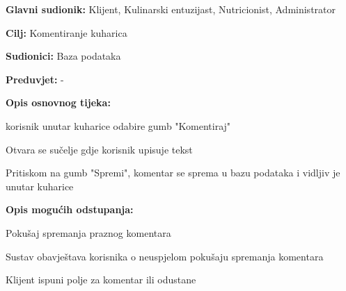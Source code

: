 			\noindent {}
					\begin{packed_item}
	
						\item \textbf{Glavni sudionik: }Klijent, Kulinarski entuzijast, Nutricionist, Administrator 
						\item  \textbf{Cilj:} Komentiranje kuharica
						\item  \textbf{Sudionici:} Baza podataka
						\item  \textbf{Preduvjet:} -
						\item  \textbf{Opis osnovnog tijeka:} 
						
						\item[] \begin{packed_enum}
	
							\item korisnik unutar kuharice odabire gumb "Komentiraj"
							\item Otvara se sučelje gdje korisnik upisuje tekst
							\item Pritiskom na gumb "Spremi", komentar se sprema u bazu podataka i vidljiv je unutar kuharice
						\end{packed_enum}
						
						\item  \textbf{Opis mogućih odstupanja:}
						
						\item[] \begin{packed_item}
	
							\item[2.a] Pokušaj spremanja praznog komentara
							\item[] \begin{packed_enum}
								
								\item Sustav obavještava korisnika o neuspjelom pokušaju spremanja komentara 
								\item Klijent ispuni polje za komentar ili odustane
								
							\end{packed_enum}

						\end{packed_item}
					\end{packed_item}




